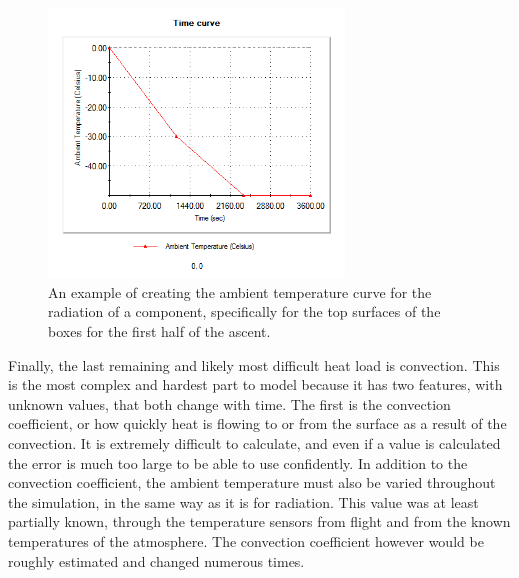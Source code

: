 \begin{figure}
    \centering
    \includegraphics[width=0.7\textwidth]{chap4_images/ascent_images/ascent_pt1_top_box_rad.png}
    \caption{An example of creating the ambient temperature curve for the radiation of a component, specifically for the top surfaces of the boxes for the first half of the ascent.}
    \label{fig:ascent_pt1_top_box_rad}
\end{figure}

Finally, the last remaining and likely most difficult heat load is convection. This is the most complex and hardest part to model because it has two features, with unknown values, that both change with time. The first is the convection coefficient, or how quickly heat is flowing to or from the surface as a result of the convection. It is extremely difficult to calculate, and even if a value is calculated the error is much too large to be able to use confidently. In addition to the convection coefficient, the ambient temperature must also be varied throughout the simulation, in the same way as it is for radiation. This value was at least partially known, through the temperature sensors from flight and from the known temperatures of the atmosphere. The convection coefficient however would be roughly estimated and changed numerous times.

